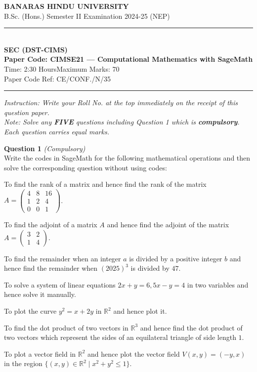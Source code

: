 \documentclass[11pt,a4paper]{article}
\begin{document}
\begin{center}
  {\large\bfseries BANARAS HINDU UNIVERSITY}\\[2pt]
  {\normalsize B.Sc. (Hons.) Semester II Examination 2024-25 (NEP)}\\[6pt]
  \rule{0.8\linewidth}{0.5pt}\\[6pt]
  {\large\bfseries SEC (DST-CIMS)}\\[4pt]
  {\large\bfseries Paper Code: CIMSE21 --- Computational Mathematics with SageMath}\\[4pt]
  {\normalsize Time: 2:30 Hours\hfill Maximum Marks: 70}\\[2pt]
  {\small Paper Code Ref: CE/CONF./N/35}
\end{center}

\rule{\linewidth}{0.4pt}\smallskip



\noindent   \textit{Instruction: Write your Roll No. at the top immediately on the receipt of this question paper.}\\[2pt]



\noindent   \textit{Note: Solve any   \textbf{FIVE} questions including Question 1 which is   \textbf{compulsory}. Each question carries equal marks.}
\bigskip




\noindent   \textbf{Question 1}   \textit{(Compulsory)} \\
Write the codes in SageMath for the following mathematical operations and then solve the corresponding question without using codes:

\begin{parts}
  \item To find the rank of a matrix and hence find the rank of the matrix $A = 
\begin{pmatrix} 4 & 8 & 16 \\ 1 & 2 & 4 \\ 0 & 0 & 1 \end{pmatrix}$.
  \item To find the adjoint of a matrix $A$ and hence find the adjoint of the matrix $A = 
\begin{pmatrix} 3 & 2 \\ 1 & 4 \end{pmatrix}$.
  \item To find the remainder when an integer $a$ is divided by a positive integer $b$ and hence find the remainder when $(2025)^3$ is divided by $47$.
  \item To solve a system of linear equations $2x + y = 6, 5x - y = 4$ in two variables and hence solve it manually.
  \item To plot the curve $y^2 = x + 2y$ in $\mathbb{R}^2$ and hence plot it.
  \item To find the dot product of two vectors in $\mathbb{R}^3$ and hence find the dot product of two vectors which represent the sides of an equilateral triangle of side length $1$.
  \item To plot a vector field in $\mathbb{R}^2$ and hence plot the vector field $V(x,y) = (-y, x)$ in the region $\{(x,y) \in \mathbb{R}^2 \mid x^2 + y^2 \le 1\}$.
\end{parts}
\end{document}
